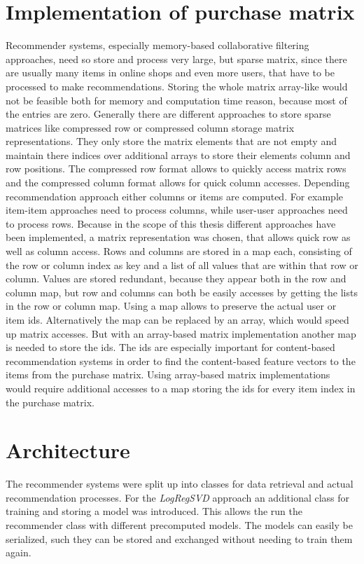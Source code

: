 \documentclass[10pt]{reportMaster}
\begin{document}
\section{Implementation of purchase matrix}
\label{sec:ImplementationOfPurchaseMatrix}
Recommender systems, especially memory-based collaborative filtering approaches, need so store and process very large, but sparse matrix, since there are usually many items in online shops and even more users, that have to be processed to make recommendations.
Storing the whole matrix array-like would not be feasible both for memory and computation time reason, because most of the entries are zero.
Generally there are different approaches to store sparse matrices like compressed row or compressed column storage matrix representations.
They only store the matrix elements that are not empty and maintain there indices over additional arrays to store their elements column and row positions.
The compressed row format allows to quickly access matrix rows and the compressed column format allows for quick column accesses.
Depending recommendation approach either columns or items are computed.
For example item-item approaches need to process columns, while user-user approaches need to process rows.
Because in the scope of this thesis different approaches have been implemented, a matrix representation was chosen, that allows quick row as well as column access.
Rows and columns are stored in a map each, consisting of the row or column index as key and a list of all values that are within that row or column.
Values are stored redundant, because they appear both in the row and column map, but row and columns can both be easily accesses by getting the lists in the row or column map.
Using a map allows to preserve the actual user or item ids.
Alternatively the map can be replaced by an array, which would speed up matrix accesses.
But with an array-based matrix implementation another map is needed to store the ids.
The ids are especially important for content-based recommendation systems in order to find the content-based feature vectors to the items from the purchase matrix.
Using array-based matrix implementations would require additional accesses to a map storing the ids for every item index in the purchase matrix.



\section{Architecture}
\label{sec:Architecture}
The recommender systems were split up into classes for data retrieval and actual recommendation processes.
For the \textit{LogRegSVD} approach an additional class for training and storing a model was introduced.
This allows the run the recommender class with different precomputed models.
The models can easily be serialized, such they can be stored and exchanged without needing to train them again.
\end{document}
